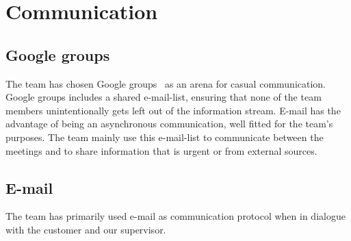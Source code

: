 \section{Communication}
\subsection{Google groups}
The team has chosen Google groups~\cite{ggroups} as an arena for casual communication. Google groups includes a shared e-mail-list, ensuring that none of the team members unintentionally gets left out of the information stream. E-mail has the advantage of being an asynchronous communication, well fitted for the team's purposes. The team mainly use this e-mail-list to communicate between the meetings and to share information that is urgent or from external sources. 

\subsection{E-mail}
The team has primarily used e-mail as communication protocol when in dialogue with the customer and our supervisor.